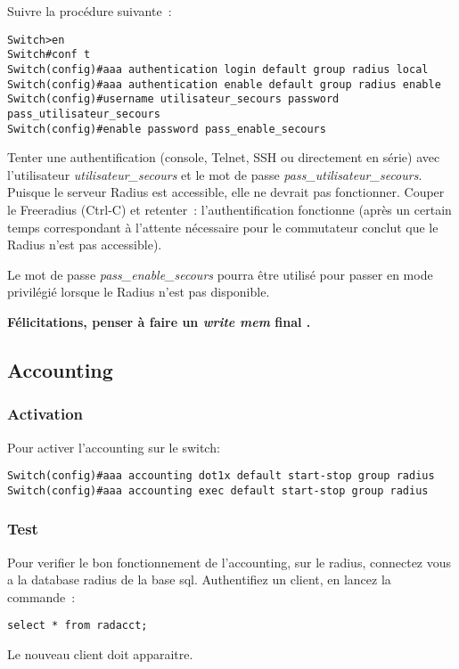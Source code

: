 Suivre la procédure suivante~:

\begin{lstlisting}
Switch>en
Switch#conf t
Switch(config)#aaa authentication login default group radius local
Switch(config)#aaa authentication enable default group radius enable
Switch(config)#username utilisateur_secours password pass_utilisateur_secours
Switch(config)#enable password pass_enable_secours
\end{lstlisting}

Tenter une authentification (console, Telnet, SSH ou directement en série) avec l'utilisateur \emph{utilisateur\_secours} et le mot de passe \emph{pass\_utilisateur\_secours}. Puisque le serveur Radius est accessible, elle ne devrait pas fonctionner. Couper le Freeradius (Ctrl-C) et retenter~: l'authentification fonctionne (après un certain temps correspondant à l'attente nécessaire pour le commutateur conclut que le Radius n'est pas accessible).

Le mot de passe \emph{pass\_enable\_secours} pourra être utilisé pour passer en mode privilégié lorsque le Radius n'est pas disponible.

\textbf{Félicitations, penser à faire un \emph{write mem} final \Coffeecup.}


\subsection{Accounting}
\subsubsection{Activation}
Pour activer l'accounting sur le switch: 
\begin{lstlisting}
Switch(config)#aaa accounting dot1x default start-stop group radius
Switch(config)#aaa accounting exec default start-stop group radius
\end{lstlisting}

\subsubsection{Test}
Pour verifier le bon fonctionnement de l'accounting, sur le radius, connectez vous a la database radius de la base sql.
Authentifiez un client, en lancez la commande~: 
\begin{lstlisting}
select * from radacct;
\end{lstlisting}
Le nouveau client doit apparaitre.
